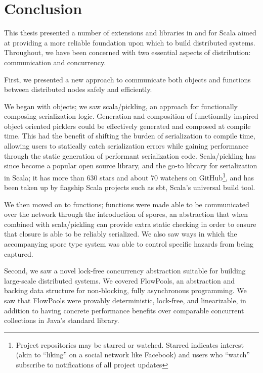 \chapter*{Conclusion}

\vspace{-0.5cm}

This thesis presented a number of extensions and libraries in and for Scala
aimed at providing a more reliable foundation upon which to build distributed
systems. Throughout, we have been concerned with two essential aspects of
distribution: communication and concurrency.

First, we presented a new approach to communicate both objects and functions between distributed nodes safely and efficiently.

We began with objects; we saw scala/pickling, an approach for functionally
composing serialization logic. Generation and composition of
functionally-inspired object oriented picklers could be effectively generated
and composed at compile time. This had the benefit of shifting the burden of
serialization to compile time, allowing users to statically catch serialization
errors while gaining performance through the static generation of performant
serialization code. Scala/pickling has since become a popular open source
library, and the go-to library for serialization in Scala; it has more than 630
stars and about 70 watchers on GitHub\footnote{Project repositories may be
starred or watched. Starred indicates interest (akin to ``liking'' on a social
network like Facebook) and users who ``watch'' subscribe to notifications of all
project updates}, and has been taken up by flagship Scala projects such as sbt,
Scala's universal build tool.

We then moved on to functions; functions were made able to be communicated over
the network through the introduction of spores, an abstraction that when
combined with scala/pickling can provide extra static checking in order to
ensure that closure is able to be reliably serialized. We also saw ways in which
the accompanying spore type system was able to control specific hazards from
being captured.

Second, we saw a novel lock-free concurrency abstraction suitable for building
large-scale distributed systems. We covered FlowPools, an abstraction and
backing data structure for non-blocking, fully asynchronous programming. We saw
that FlowPools were provably deterministic, lock-free, and linearizable, in
addition to having concrete performance benefits over comparable concurrent
collections in Java's standard library.

